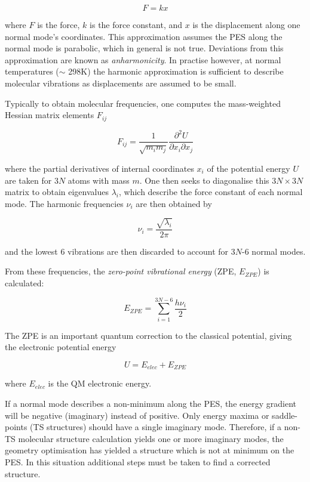 \begin{equation}
  F = kx
\end{equation}


\noindent where $F$ is the force, $k$ is the force constant, and $x$ is the displacement along one normal mode's coordinates. This approximation assumes the PES along the normal mode is parabolic, which in general is not true. Deviations from this approximation are known as \emph{anharmonicity}. In practise however, at normal temperatures ($\sim$ 298K) the harmonic approximation is sufficient to describe molecular vibrations as displacements are assumed to be small.

Typically to obtain molecular frequencies, one computes the mass-weighted Hessian matrix elements $F_{ij}$

\begin{equation}
  F_{ij} = \frac{1}{\sqrt{m_im_j}}\frac{\partial^2U}{\partial x_i\partial x_j}
\end{equation}

\noindent where the partial derivatives of internal coordinates $x_i$ of the potential energy $U$ are taken for 3$N$ atoms with mass $m$. One then seeks to diagonalise this $3N\times3N$ matrix to obtain eigenvalues $\lambda_i$, which describe the force constant of each normal mode. The harmonic frequencies $\nu_i$ are then obtained by

\begin{equation}
  \nu_i = \frac{\sqrt{\lambda_i}}{2\pi}
\end{equation}

\noindent and the lowest 6 vibrations are then discarded to account for 3$N$-6 normal modes.

From these frequencies, the \emph{zero-point vibrational energy} (ZPE, $E_{ZPE}$) is calculated:

\begin{equation}
  E_{ZPE} = \sum_{i=1}^{3N-6} \frac{h\nu_i}{2}
\end{equation}

\noindent The ZPE is an important quantum correction to the classical potential, giving the electronic potential energy

\begin{equation}
U = E_{elec} + E_{ZPE}
\end{equation}

\noindent where $E_{elec}$ is the QM electronic energy.

If a normal mode describes a non-minimum along the PES, the energy gradient will be negative (imaginary) instead of positive. Only energy maxima or saddle-points (TS structures) should have a single imaginary mode. Therefore, if a non-TS molecular structure calculation yields one or more imaginary modes, the geometry optimisation has yielded a structure which is not at minimum on the PES. In this situation additional steps must be taken to find a corrected structure.

